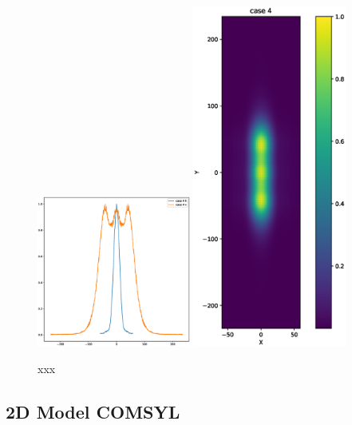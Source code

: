 \documentclass{iucr}              %
\begin{document}
\begin{figure}
    \includegraphics[width=0.45\textwidth]{figures/case_4_profiles.eps}
    \includegraphics[width=0.45\textwidth]{figures/case_4_image.eps}
        
    \caption{xxx
    }
    
\end{figure}


\subsection{2D Model COMSYL}
\end{document}
